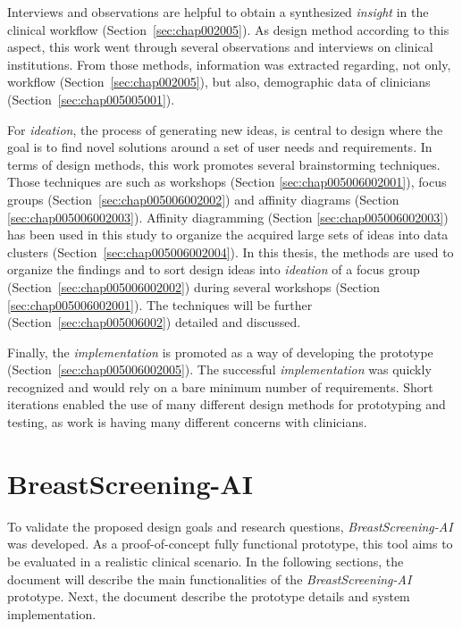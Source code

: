 Interviews and observations are helpful to obtain a synthesized {\it insight} in the clinical workflow (Section~\ref{sec:chap002005}).
As design method according to this aspect, this work went through several observations and interviews on clinical institutions.
From those methods, information was extracted regarding, not only, workflow (Section~\ref{sec:chap002005}), but also, demographic data of clinicians (Section~\ref{sec:chap005005001}).

For {\it ideation}, the process of generating new ideas, is central to design where the goal is to find novel solutions around a set of user needs and requirements.
In terms of design methods, this work promotes several brainstorming techniques.
Those techniques are such as workshops (Section \ref{sec:chap005006002001}), focus groups (Section~\ref{sec:chap005006002002}) and affinity diagrams (Section \ref{sec:chap005006002003}).
Affinity diagramming (Section \ref{sec:chap005006002003}) has been used in this study to organize the acquired large sets of ideas into data clusters (Section~\ref{sec:chap005006002004}).
In this thesis, the methods are used to organize the findings and to sort design ideas into {\it ideation} of a focus group (Section~\ref{sec:chap005006002002}) during several workshops (Section \ref{sec:chap005006002001}).
The techniques will be further (Section~\ref{sec:chap005006002}) detailed and discussed.

Finally, the {\it implementation} is promoted as a way of developing the prototype (Section~\ref{sec:chap005006002005}).
The successful {\it implementation} was quickly recognized and would rely on a bare minimum number of requirements.
Short iterations enabled the use of many different design methods for prototyping and testing, as work is having many different concerns with clinicians.

\section{BreastScreening-AI}
\label{sec:chap005004}

To validate the proposed design goals and research questions, {\it BreastScreening-AI} was developed.
As a proof-of-concept fully functional prototype, this tool aims to be evaluated in a realistic clinical scenario.
In the following sections, the document will describe the main functionalities of the {\it BreastScreening-AI} prototype.
Next, the document describe the prototype details and system implementation.

